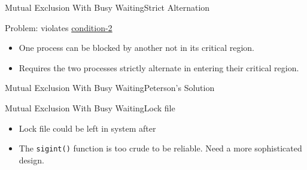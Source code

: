 \begin{frame}{Mutual Exclusion With Busy Waiting}{Strict Alternation}
  \begin{center}
  \end{center}
  \begin{block}{Problem: violates \hyperlink{cond}{condition-2}}
    \begin{itemize}
    \item One process can be blocked by another not in its critical region.
    \item Requires the two processes strictly alternate in entering their critical region.
    \end{itemize}
  \end{block}
\end{frame}

\begin{frame}{Mutual Exclusion With Busy Waiting}{Peterson's Solution}
  \begin{center}
  \end{center}
  \begin{refsection}
    \nocite{wiki:peterson}
    \printbibliography[heading=none]
  \end{refsection}
\end{frame}

\begin{frame}{Mutual Exclusion With Busy Waiting}{Lock file}
  \begin{itemize}
  \item[\Bad] Lock file could be left in system after \Cc
  \end{itemize}
\end{frame}

\begin{frame}{\wrong}
\end{frame}

\begin{itemize}
\item The \texttt{sigint()} function is too crude to be reliable. Need a more sophisticated design.
\end{itemize}

